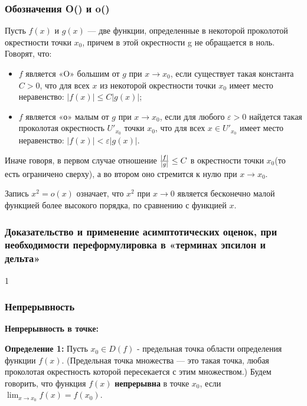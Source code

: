 \documentclass[12pt]{matmex-diploma}
\begin{document}
            
        \subsubsection*{Обозначения O() и o()}
            
            Пусть $f(x)$ и $g(x)$ — две функции, определенные в некоторой проколотой окрестности точки $x_0$, причем в этой окрестности g не обращается в ноль. Говорят, что:
                \begin{itemize}
                \item $f$ является «O» большим от $g$ при $x \to x_0$, если существует такая константа $C > 0$, что для всех $x$ из некоторой окрестности точки $x_0$ имеет место неравенство: $|f(x)|\leq C|g(x)|$;
                \item $f$ является «о» малым от $g$ при $x \to x_0$, если для любого $\varepsilon>0$ найдется такая проколотая окрестность $U'_{x_0}$ точки $x_0$, что для всех $x \in U'_{x_0}$ имеет место неравенство: $|f(x)| < \varepsilon|g(x)|$.
                \end{itemize} 
            
            Иначе говоря, в первом случае отношение ${|f| \over |g|} \leq C$ в окрестности точки $x_0$(то есть ограничено сверху), а во втором оно стремится к нулю при $x \to x_0$.
            
            Запись $x^2 = o(x)$ означает, что $x^2$ при $x \to 0$ является бесконечно малой функцией более высокого порядка, по сравнению с функцией $x$.
            
        \subsubsection*{Доказательство и применение асимптотических оценок, при необходимости переформулировка в «терминах эпсилон и дельта»}
            1
        \subsubsection*{Непрерывность}
        
            \textbf{Непрерывность в точке:}
            
            \textbf{Определение 1:}
            Пусть $x_0 \in D(f)$ - предельная точка области определения функции $f(x)$. (Предельная точка множества — это такая точка, любая проколотая окрестность которой пересекается с этим множеством.)  Будем говорить, что функция $f(x)$ \textbf{непрерывна} в точке $x_0$, если $\lim_{x \to x_0}f(x) = f(x_0)$.
            
\end{document}
